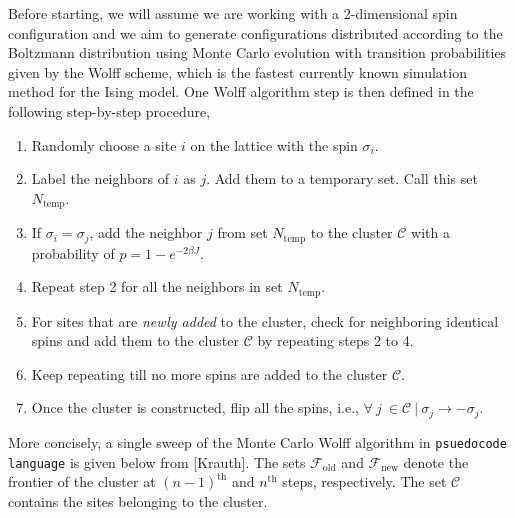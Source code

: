\documentclass[../thesis_main.tex]{subfiles}
\begin{document}
Before starting, we will assume we are working with a 2-dimensional spin configuration and we aim to generate configurations distributed according to the Boltzmann distribution using Monte Carlo evolution with transition probabilities given by the Wolff scheme, which is the fastest currently known simulation method for the Ising model. One Wolff algorithm step is then defined in the following step-by-step procedure,
\begin{enumerate}
    \setlength\itemsep{0.3em}
    \item Randomly choose a site $i$ on the lattice with the spin $\sigma_i$.
    \item Label the neighbors of $i$ as $j$. Add them to a temporary set. Call this set $N_\text{temp}$. 
    \item If $\sigma_i = \sigma_j$, add the neighbor $j$ from set $N_\text{temp}$ to the cluster $\mathcal{C}$  with a probability of $p = 1 - e^{-2\beta J}$.
    \item Repeat step 2 for all the neighbors in set $N_\text{temp}$.
    \item For sites that are \textit{newly added} to the cluster, check for neighboring identical spins and add them to the cluster $\mathcal{C}$ by repeating steps 2 to 4.
    \item Keep repeating till no more spins are added to the cluster $\mathcal{C}$.
    \item Once the cluster is constructed, flip all the spins, i.e., $\forall \:j \: \in \mathcal{C} \: | \: \sigma_j \to - \sigma_j$.
\end{enumerate}
More concisely, a single sweep of the Monte Carlo Wolff algorithm in \texttt{psuedocode language} is given below from [Krauth]. The sets $\mathcal{F}_\text{old}$ and $\mathcal{F}_\text{new}$ denote the frontier of the cluster at $(n-1)^\text{th}$ and $n^\text{th}$ steps, respectively. The set $\mathcal{C}$ contains the sites belonging to the cluster.
\end{document}
